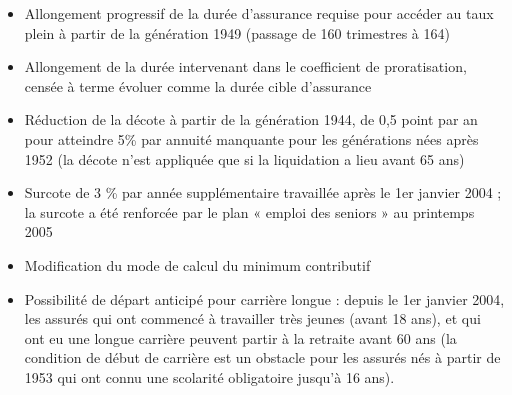 \begin{itemize}
   \item	Allongement progressif de la durée d'assurance requise pour accéder au taux plein à partir de la génération 1949 (passage de 160 
         trimestres à 164)
   \item	Allongement de la durée intervenant dans le coefficient de proratisation, censée à terme évoluer comme la durée cible d'assurance
   \item	Réduction de la décote à partir de la génération 1944, de 0,5 point par an pour atteindre 5\% par annuité manquante pour les 
         générations nées après 1952 (la décote n'est appliquée que si la liquidation a lieu avant 65 ans)
   \item	Surcote de 3 \% par année supplémentaire travaillée après le 1er janvier 2004 ; la surcote a été renforcée par le plan « emploi des 
seniors » au printemps 2005
   \item	Modification du mode de calcul du minimum contributif
   \item	Possibilité de départ anticipé pour carrière longue : depuis le 1er janvier 2004, les assurés qui ont commencé à travailler très 
         jeunes (avant 18 ans), et qui ont eu une longue carrière  peuvent partir à la retraite avant 60 ans (la condition de début de carrière est 
         un obstacle pour les assurés nés à partir de 1953 qui ont connu une scolarité obligatoire jusqu'à 16 ans).
\end{itemize}

